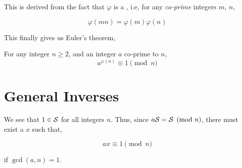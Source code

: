 This is derived from the fact that \(\varphi\) is a , i.e, for any 
\emph{co-prime} integers \(m\), \(n\),

\begin{equation}
    \varphi(mn) = \varphi(m)\varphi(n)
\end{equation}

This finally gives us Euler's theorem, 

\begin{theorem}
    For any integer \(n \ge 2\), and an integer \(a\) co-prime to \(n\), 
    \begin{equation}
        a^{\varphi(n)} \equiv 1 \pmod{n}
    \end{equation}
\end{theorem}

\section{General Inverses}

We see that \(1 \in \mathcal{S}\) for all integers \(n\). Thus, 
since \(a\mathcal{S} = \mathcal{S} \pmod{n}\), there must exist a \(x\) such that, 

\begin{equation*}
    ax \equiv 1 \pmod{n}
\end{equation*}

if \(\gcd(a, n) = 1\).